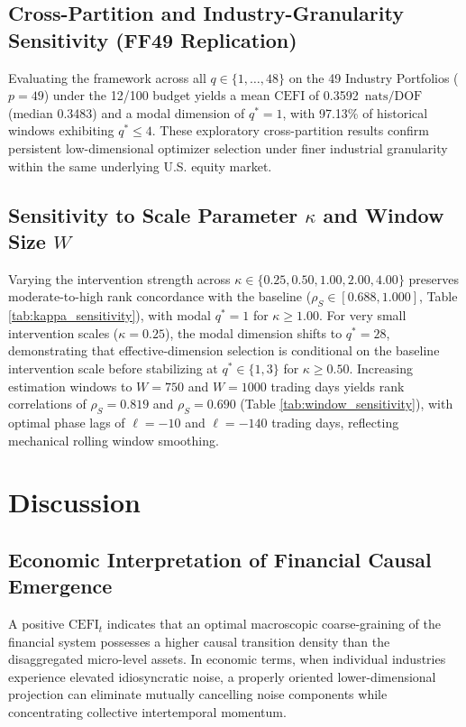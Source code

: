 \documentclass[review,12pt,authoryear]{elsarticle}
\begin{document}
\subsection{Cross-Partition and Industry-Granularity Sensitivity (FF49 Replication)}
Evaluating the framework across all $q \in \{1, \dots, 48\}$ on the 49 Industry Portfolios ($p=49$) under the 12/100 budget yields a mean $\mathrm{CEFI}$ of 0.3592\ $\mathrm{nats/DOF}$ (median 0.3483) and a modal dimension of $q^* = 1$, with 97.13\% of historical windows exhibiting $q^* \le 4$. These exploratory cross-partition results confirm persistent low-dimensional optimizer selection under finer industrial granularity within the same underlying U.S. equity market.

\subsection{Sensitivity to Scale Parameter \texorpdfstring{$\kappa$}{kappa} and Window Size \texorpdfstring{$W$}{W}}
Varying the intervention strength across $\kappa \in \{0.25, 0.50, 1.00, 2.00, 4.00\}$ preserves moderate-to-high rank concordance with the baseline ($\rho_S \in [0.688, 1.000]$, Table \ref{tab:kappa_sensitivity}), with modal $q^* = 1$ for $\kappa \ge 1.00$. For very small intervention scales ($\kappa = 0.25$), the modal dimension shifts to $q^* = 28$, demonstrating that effective-dimension selection is conditional on the baseline intervention scale before stabilizing at $q^* \in \{1, 3\}$ for $\kappa \ge 0.50$. Increasing estimation windows to $W = 750$ and $W = 1000$ trading days yields rank correlations of $\rho_S = 0.819$ and $\rho_S = 0.690$ (Table \ref{tab:window_sensitivity}), with optimal phase lags of $\ell = -10$ and $\ell = -140$ trading days, reflecting mechanical rolling window smoothing.

\section{Discussion}
\label{sec:discussion}

\subsection{Economic Interpretation of Financial Causal Emergence}
A positive $\mathrm{CEFI}_t$ indicates that an optimal macroscopic coarse-graining of the financial system possesses a higher causal transition density than the disaggregated micro-level assets. In economic terms, when individual industries experience elevated idiosyncratic noise, a properly oriented lower-dimensional projection can eliminate mutually cancelling noise components while concentrating collective intertemporal momentum.
\end{document}
